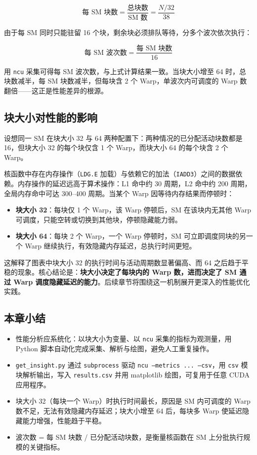 \[
\text{每 SM 块数} = \frac{\text{总块数}}{\text{SM 数}} = \frac{N / 32}{38}
\]

由于每 SM 同时只能驻留 16 个块，剩余块必须排队等待，分多个波次依次执行：

\[
\text{每 SM 波次数} = \frac{\text{每 SM 块数}}{16}
\]

用 \texttt{ncu} 采集可得每 SM 波次数，与上式计算结果一致。当块大小增至 64 时，总块数减半，每 SM 块数减半，但每块含 2 个 Warp，单波次内可调度的 Warp 数翻倍——这正是性能差异的根源。

\subsection{块大小对性能的影响}

设想同一 SM 在块大小 32 与 64 两种配置下：两种情况的已分配活动块数都是 16，但块大小 32 的每个块仅含 1 个 Warp，而块大小 64 的每个块含 2 个 Warp。

核函数中存在内存操作（\texttt{LDG.E} 加载）与依赖它的加法（\texttt{IADD3}）之间的数据依赖。内存操作的延迟远高于算术操作：L1 命中约 30 周期，L2 命中约 200 周期，全局内存命中可达 300--400 周期。当某个 Warp 因等待内存结果而停顿时：

\begin{itemize}
    \item \textbf{块大小 32}：每块仅 1 个 Warp，该 Warp 停顿后，SM 在该块内无其他 Warp 可调度，只能空转或切换到其他块，停顿隐藏能力弱。
    \item \textbf{块大小 64}：每块 2 个 Warp，一个 Warp 停顿时，SM 可立即调度同块的另一个 Warp 继续执行，有效隐藏内存延迟，总执行时间更短。
\end{itemize}

这解释了图表中块大小 32 的执行时间与活动周期数显著偏高、而 64 之后趋于平稳的现象。核心结论是：\textbf{块大小决定了每块内的 Warp 数，进而决定了 SM 通过 Warp 调度隐藏延迟的能力}。后续章节将围绕这一机制展开更深入的性能优化实践。

\subsection{本章小结}

\begin{itemize}
    \item 性能分析应系统化：以块大小为变量、以 \texttt{ncu} 采集的指标为观测量，用 Python 脚本自动化完成采集、解析与绘图，避免人工重复操作。
    \item \texttt{get\_insight.py} 通过 \texttt{subprocess} 驱动 \texttt{ncu --metrics ... --csv}，用 \texttt{csv} 模块解析输出，写入 \texttt{results.csv} 并用 matplotlib 绘图，可复用于任意 CUDA 应用程序。
    \item 块大小 32（每块一个 Warp）时执行时间最长，原因是 SM 内可调度的 Warp 数不足，无法有效隐藏内存延迟；块大小增至 64 后，每块多 Warp 使延迟隐藏能力增强，性能趋于平稳。
    \item 波次数 = 每 SM 块数 / 已分配活动块数，是衡量核函数在 SM 上分批执行规模的关键指标。
\end{itemize}
